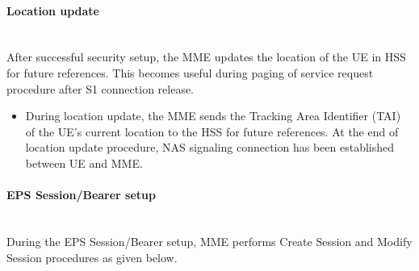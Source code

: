 \documentclass[hidelinks]{report}
\begin{document}
\paragraph*{Location update}

~\\ After successful security setup, the MME updates the location of the UE in HSS for future references. This becomes useful during paging of service request procedure after S1 connection release.

\begin{itemize}

\item During location update, the MME sends the Tracking Area Identifier (TAI) of the UE's current location to the HSS for future references. At the end of location update procedure, NAS signaling connection has been established between UE and MME.

\end{itemize}

\paragraph*{EPS Session/Bearer setup}

~\\ During the EPS Session/Bearer setup, MME performs Create Session and Modify Session procedures as given below.
\end{document}
